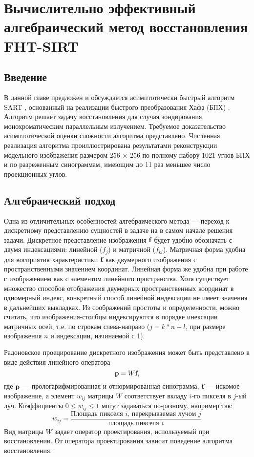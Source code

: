 \chapter{Вычислительно эффективный алгебраический метод восстановления FHT-SIRT} \label{chapt1}

\section{Введение}

В данной главе предложен и обсуждается асимптотически быстрый алгоритм SART \cite{sart}, основанный на реализации быстрого преобразования Хафа (БПХ) \cite{hough}.
Алгоритм решает задачу восстановления для случая зондирования монохроматическим параллельным излучением.
Требуемое доказательство асимптотической оценки сложности алгоритма представлено.
Численная реализация алгоритма проиллюстрирована результатами реконструкции модельного изображения размером 256 $\times$ 256 по полному набору 1021 углов БПХ и по разреженным синограммам, имеющим до 11 раз меньшее число проекционных углов.

\section{Алгебраический подход}
Одна из отличительных особенностей алгебраического метода --- переход к дискретному представлению сущностей в задаче на в самом начале решения задачи. 
Дискретное представление изображения $\textbf f$ будет удобно обозначать с двумя индексациями: линейной ($f_j$) и матричной ($f_{kl}$). 
Матричная форма удобна для восприятия характеристики $\textbf f$ как двумерного изображения с пространственными значением координат.
Линейная форма же удобна при работе с изображением как с элементом линейного пространства.
Хотя существует множество способов отображения двумерных пространственных координат в одномерный индекс, конкретный способ линейной индексации не имеет значения в дальнейших выкладках.
Из соображений простоты и определенности, можно считать, что изображения-столбцы индексируются в порядке инексации матричных осей, т.е. по строкам слева-направо ($j = k * n + l$, при размере изображения $n$ и индексации, начинаемой с 1).

Радоновское проецирование дискретного изображения может быть представлено в виде действия линейного оператора
\begin{equation}\label{eq:linear_system}
\textbf p = W \textbf f,
\end{equation}
где $\textbf p$ --- прологарифмированная и отнормированная синограмма, $\textbf f$ --- искомое изображение, а элемент $w_{ij}$ матрицы $W$ соответствует вкладу $i$-го пикселя в $j$-ый луч.
Коэффициенты $0 \leq w_{ij} \leq 1$ могут задаваться по-разному, например так:
\begin{equation}
\label{eq:coeff}
w_{ij} = \frac{\text{Площадь пикселя $i$, перекрываемая лучом $j$}}{\text{площадь пикселя $i$}}
\end{equation}
Вид матрицы $W$ задает оператор проектирования, используемый при восстановлении.
От оператора проектирования зависит поведение алгоритма восстановления.

